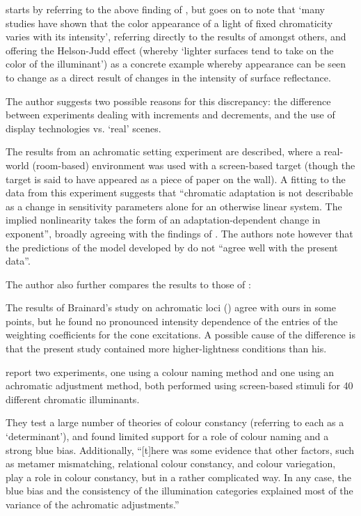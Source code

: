 \textbf{\citet{kuriki_loci_2006}} starts by referring to the above finding of \citet{brainard_color_1998}, but goes on to note that `many studies have shown that the color appearance of a light of fixed chromaticity varies with its intensity', referring directly to the results of \citet{werner_effect_1982} amongst others, and offering the Helson-Judd effect (whereby `lighter surfaces tend to take on the color of the illuminant') as a concrete example whereby appearance can be seen to change as a direct result of changes in the intensity of surface reflectance.

The author suggests two possible reasons for this discrepancy: the difference between experiments dealing with increments and decrements, and the use of display technologies vs. `real' scenes.

The results from an achromatic setting experiment are described, where a real-world (room-based) environment was used with a screen-based target (though the target is said to have appeared as a piece of paper on the wall). A fitting to the data from this experiment suggests that ``chromatic adaptation is not describable as a change in sensitivity parameters alone for an otherwise linear system. The implied nonlinearity takes the form of an adaptation-dependent change in exponent'', broadly agreeing with the findings of \citet{walraven_chromatic_1982}. The authors note however that the predictions of the model developed by \citet{walraven_chromatic_1982} do not ``agree well with the present data''.

The author also further compares the results to those of \citet{brainard_color_1998}:

\begin{itquote}{}
The results of Brainard's study on achromatic loci (\citet{brainard_color_1998}) agree with ours in some points, but he found no pronounced intensity dependence of the entries of the weighting coefficients for the cone excitations. A possible cause of the difference is that the present study contained more higher-lightness conditions than his.
\end{itquote}

\textbf{\citet{weiss_determinants_2017}} report two experiments, one using a colour naming method and one using an achromatic adjustment method, both performed using screen-based stimuli for 40 different chromatic illuminants.

They test a large number of theories of colour constancy (referring to each as a `determinant'), and found limited support for a role of colour naming and a strong blue bias. Additionally, ``[t]here was some evidence that other factors, such as metamer mismatching, relational colour constancy, and colour variegation, play a role in colour constancy, but in a rather complicated way. In any case, the blue bias and the consistency of the illumination categories explained most of the variance of the achromatic adjustments.''






